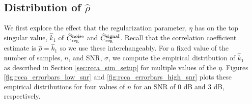 \subsection{Distribution of $\widehat{\rho}$}

We first explore the effect that the regularization parameter, $\eta$ has on the top
singular value, $\widehat{k}_1$ of $\widehat{C}_{\text{reg}}^{\text{noise}}$ and
$\widehat{C}_{\text{reg}}^{\text{signal}}$. Recall that the correlation coefficient estimate is
$\widehat{\rho} = \widehat{k}_1$ so we use these interchangeably. For a fixed value of the
number of samples, $n$, and SNR, $\sigma$, we compute the empirical distribution of
$\widehat{k}_1$ as described in Section \ref{sec:rcca_sim_setup} for multiple values of
the $\eta$. Figures \ref{fig:rcca_errorbars_low_snr} and \ref{fig:rcca_errorbars_high_snr}
plots these empirical distributions for four values of $n$ for an SNR of 0 dB and 3 dB,
respectively.

